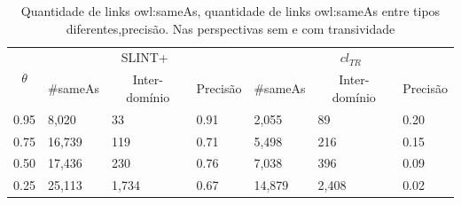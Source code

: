 \begin{table}[h]
	\centering
	\caption{Quantidade de links owl:sameAs, quantidade de links owl:sameAs entre tipos diferentes,precisão. Nas perspectivas sem e com transividade}
	\label{tab:homoceanu2014putting}
	\begin{tabular}{@{}l|lll|lll@{}}
		\toprule
		\multicolumn{1}{c|}{\multirow{2}{*}{$\theta$}} & \multicolumn{3}{c|}{SLINT+}                                                                      & \multicolumn{3}{c}{$cl_{TR}$}                                                                  \\
		\multicolumn{1}{c|}{}                        & \multicolumn{1}{c}{\#sameAs} & \multicolumn{1}{c}{Inter-domínio} & \multicolumn{1}{c|}{Precisão} & \multicolumn{1}{c}{\#sameAs} & \multicolumn{1}{c}{Inter-domínio} & \multicolumn{1}{c}{Precisão} \\ \midrule
		0.95                                         & 8,020                        & 33                                & 0.91                          & 2,055                        & 89                                & 0.20                         \\
		0.75                                         & 16,739                       & 119                               & 0.71                          & 5,498                        & 216                               & 0.15                         \\
		0.50                                         & 17,436                       & 230                               & 0.76                          & 7,038                        & 396                               & 0.09                         \\
		0.25                                         & 25,113                       & 1,734                             & 0.67                          & 14,879                       & 2,408                             & 0.02                         \\ \bottomrule
	\end{tabular}
\end{table}




